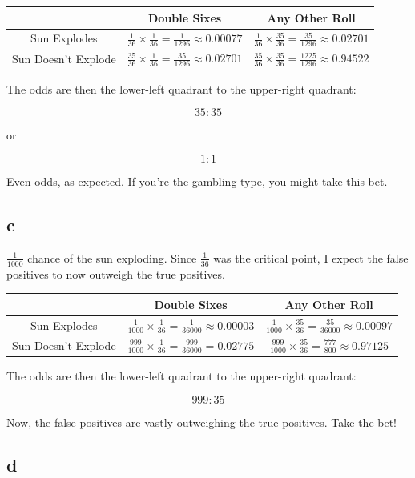 \documentclass{article}
\begin{document}
\begin{tabular}{c | c c}
	  & Double Sixes & Any Other Roll \\
	\hline
	Sun Explodes & $\frac{1}{36} \times \frac{1}{36} = \frac{1}{1296} \approx 0.00077 $ & $\frac{1}{36} \times \frac{35}{36} = \frac{35}{1296} \approx 0.02701 $ \\
	Sun Doesn't Explode & $\frac{35}{36} \times \frac{1}{36} = \frac{35}{1296} \approx 0.02701 $ & $\frac{35}{36} \times \frac{35}{36} = \frac{1225}{1296} \approx 0.94522 $ \\
\end{tabular}

The odds are then the lower-left quadrant to the upper-right quadrant:

$$
35:35
$$

or

$$
1:1
$$

Even odds, as expected. If you're the gambling type, you might take this bet.

\subsection{c}

$\frac{1}{1000}$ chance of the sun exploding. Since $\frac{1}{36}$ was the 
critical point, I expect the false positives to now outweigh the true positives.

\begin{tabular}{c | c c}
	  & Double Sixes & Any Other Roll \\
	\hline
	Sun Explodes & $\frac{1}{1000} \times \frac{1}{36} = \frac{1}{36000} \approx 0.00003 $ & $\frac{1}{1000} \times \frac{35}{36} = \frac{35}{36000} \approx 0.00097 $ \\
	Sun Doesn't Explode & $\frac{999}{1000} \times \frac{1}{36} = \frac{999}{36000} = 0.02775 $ & $\frac{999}{1000} \times \frac{35}{36} = \frac{777}{800} \approx 0.97125 $ \\
\end{tabular}

The odds are then the lower-left quadrant to the upper-right quadrant:

$$
999:35
$$

Now, the false positives are vastly outweighing the true positives. Take the 
bet!

\subsection{d}
\end{document}
